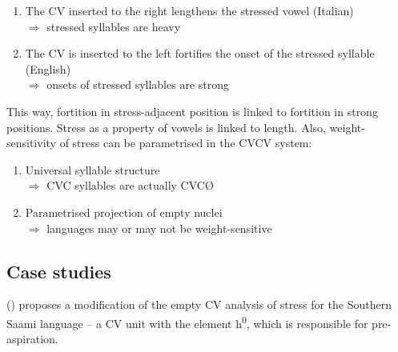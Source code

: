 \documentclass[a4paper, 12pt]{article}
\newcommand{\citeay}[2][]{
   \citeauthor{#2} (\citeyear[#1]{#2})}
\begin{document}
	\begin{enumerate}[$\gg$]
		\item The CV inserted to the right lengthens the stressed vowel (Italian)
		\\$\Rightarrow$ stressed syllables are heavy 
		\item The CV is inserted to the left fortifies the onset of the stressed syllable (English)
		\\$\Rightarrow$ onsets of stressed syllables are strong
	\end{enumerate}
	This way, fortition in stress-adjacent position is linked to fortition in strong positions. Stress as a property of vowels is linked to length. Also, weight-sensitivity of stress can be parametrised in the CVCV system:
	
	\begin{enumerate}[$\gg$]
		\item Universal syllable structure
		\\$\Rightarrow$ CVC syllables are actually CVCØ 
		\item Parametrised projection of empty nuclei
		\\$\Rightarrow$ languages may or may not be weight-sensitive
	\end{enumerate}

			\subsection{Case studies}
		
	\citeay{enguehard2014} proposes a modification of the empty CV analysis of stress for the Southern Saami language -- a CV unit with the element h\textsuperscript{0}, which is responsible for pre-aspiration.
	
\end{document}
